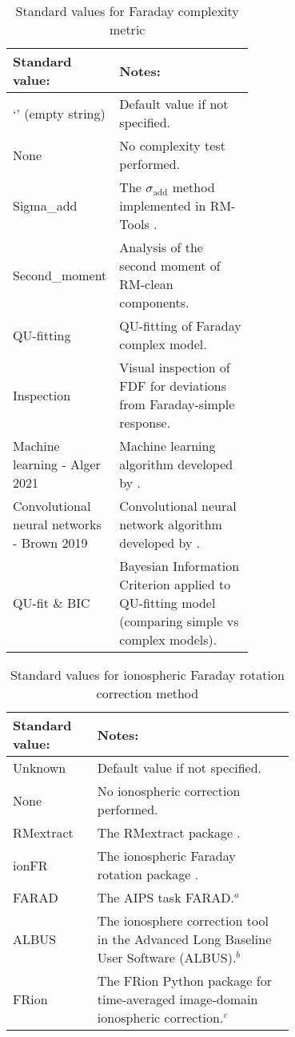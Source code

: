 \documentclass[10pt,modern]{aastex63}
\begin{document}
\begin{table}[h]
\caption{Standard values for Faraday complexity metric}\label{tab:complex_test}
\begin{center}
\begin{tabular}{|l|p{0.6\linewidth}|} \hline
{\bf Standard value:} & {\bf Notes:} \\ \hline
`'  (empty string) & Default value if not specified.\\
None & No complexity test performed.\\
Sigma\_add & The $\sigma_\mathrm{add}$ method implemented in RM-Tools \citep{RM-Tools}.\\
Second\_moment & Analysis of the second moment of RM-clean components.\\
QU-fitting & QU-fitting of Faraday complex model.\\
Inspection & Visual inspection of FDF for deviations from Faraday-simple response.\\
Machine learning - Alger 2021 & Machine learning algorithm developed by \citet{Alger2021}.\\
Convolutional neural networks - Brown 2019 & Convolutional neural network algorithm developed by \citet{Brown2019}.\\
QU-fit \& BIC & Bayesian Information Criterion applied to QU-fitting model (comparing simple vs complex models). \\
 \hline
\end{tabular}
\end{center}
\label{default}
\end{table}%


\begin{table}[h]
\caption{Standard values for ionospheric Faraday rotation  correction method}\label{tab:ionosphere}
\begin{center}
\begin{tabular}{|l|p{0.7\linewidth}|} \hline
{\bf Standard value:} & {\bf Notes:} \\ \hline
Unknown & Default value if not specified.\\
None & No ionospheric correction performed.\\
RMextract & The RMextract package \citep{RMextract}.\\
ionFR & The ionospheric Faraday rotation package \citep{Sotomayor13}. \\
FARAD & The AIPS task FARAD.$^a$\\
ALBUS & The ionosphere correction tool in the Advanced Long Baseline User Software (ALBUS).$^b$\\
FRion & The FRion Python package for time-averaged image-domain ionospheric correction.$^c$\\
\hline
\end{tabular}
\end{center}
\label{default}
\end{table}%
\end{document}
